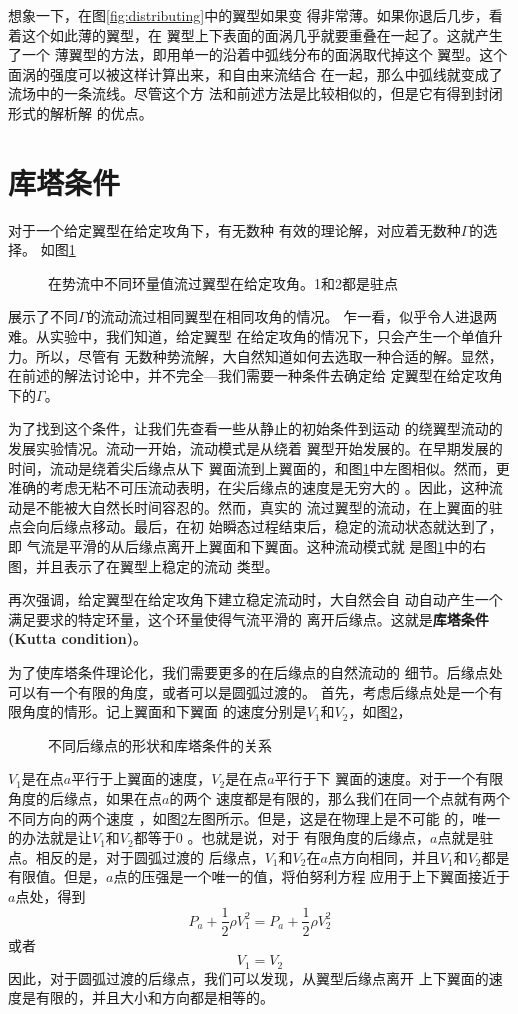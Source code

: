 想象一下，在图\ref{fig:distributing}中的翼型如果变
得非常薄。如果你退后几步，看着这个如此薄的翼型，在
翼型上下表面的面涡几乎就要重叠在一起了。这就产生了一个
薄翼型的方法，即用单一的沿着中弧线分布的面涡取代掉这个
翼型。这个面涡的强度可以被这样计算出来，和自由来流结合
在一起，那么中弧线就变成了流场中的一条流线。尽管这个方
法和前述方法是比较相似的，但是它有得到封闭形式的解析解
的优点。

\section{库塔条件}
对于一个给定翼型在给定攻角下，有无数种
有效的理论解，对应着无数种$\Gamma$的选择。
如图\ref{fig:stag}
\begin{figure}[!ht]
  \centering
  
  \caption{在势流中不同环量值流过翼型在给定攻角。1和2都是驻点}
  \label{fig:stag}
\end{figure}
展示了不同$\Gamma$的流动流过相同翼型在相同攻角的情况。
乍一看，似乎令人进退两难。从实验中，我们知道，给定翼型
在给定攻角的情况下，只会产生一个单值升力。所以，尽管有
无数种势流解，大自然知道如何去选取一种合适的解。显然，
在前述的解法讨论中，并不完全---我们需要一种条件去确定给
定翼型在给定攻角下的$\Gamma$。

为了找到这个条件，让我们先查看一些从静止的初始条件到运动
的绕翼型流动的发展实验情况。流动一开始，流动模式是从绕着
翼型开始发展的。在早期发展的时间，流动是绕着尖后缘点从下
翼面流到上翼面的，和图\ref{fig:stag}中左图相似。然而，更
准确的考虑无粘不可压流动表明，在尖后缘点的速度是无穷大的
。因此，这种流动是不能被大自然长时间容忍的。然而，真实的
流过翼型的流动，在上翼面的驻点会向后缘点移动。最后，在初
始瞬态过程结束后，稳定的流动状态就达到了，即{\color{noteorange}
气流是平滑的从后缘点离开上翼面和下翼面}。这种流动模式就
是图\ref{fig:stag}中的右图，并且表示了在翼型上稳定的流动
类型。

再次强调，给定翼型在给定攻角下建立稳定流动时，大自然会自
动自动产生一个满足要求的特定环量，这个环量使得气流平滑的
离开后缘点。这就是{\bfseries 库塔条件(Kutta condition)}。

为了使库塔条件理论化，我们需要更多的在后缘点的自然流动的
细节。后缘点处可以有一个有限的角度，或者可以是圆弧过渡的。
首先，考虑后缘点处是一个有限角度的情形。记上翼面和下翼面
的速度分别是$V_1$和$V_2$，如图\ref{fig:kutta}，
\begin{figure}[!ht]
  \centering
  
  \caption{不同后缘点的形状和库塔条件的关系}
  \label{fig:kutta}
\end{figure}
$V_1$是在点$a$平行于上翼面的速度，$V_2$是在点$a$平行于下
翼面的速度。对于一个有限角度的后缘点，如果在点$a$的两个
速度都是有限的，那么我们在同一个点就有两个不同方向的两个速度
，如图\ref{fig:kutta}左图所示。但是，这是在物理上是不可能
的，唯一的办法就是让$V_1$和$V_2$都等于0 。也就是说，对于
有限角度的后缘点，$a$点就是驻点。相反的是，对于圆弧过渡的
后缘点，$V_1$和$V_2$在$a$点方向相同，并且$V_1$和$V_2$都是
有限值。但是，$a$点的压强是一个唯一的值，将伯努利方程
应用于上下翼面接近于$a$点处，得到
\[
  P_a+\frac{1}{2}\rho V_1^2=P_a+\frac{1}{2} \rho V_2^2
\]
或者
\[
  V_1=V_2
\]
因此，对于圆弧过渡的后缘点，我们可以发现，从翼型后缘点离开
上下翼面的速度是有限的，并且大小和方向都是相等的。

